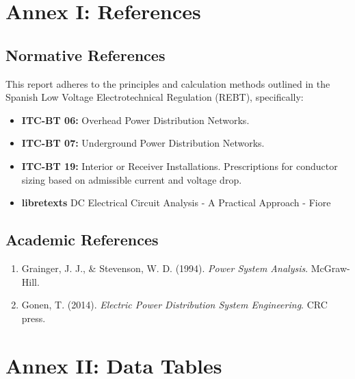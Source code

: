 \documentclass[12pt, a4paper]{article}
\begin{document}
\section{Annex I: References}
\subsection{Normative References}
This report adheres to the principles and calculation methods outlined in the Spanish Low Voltage Electrotechnical Regulation (REBT), specifically:
\begin{itemize}
    \item \textbf{ITC-BT 06:} Overhead Power Distribution Networks.
    \item \textbf{ITC-BT 07:} Underground Power Distribution Networks.
    \item \textbf{ITC-BT 19:} Interior or Receiver Installations. Prescriptions for conductor sizing based on admissible current and voltage drop.
    \item \textbf{libretexts} DC Electrical Circuit Analysis - A Practical Approach - Fiore
\end{itemize}




\subsection{Academic References}
\begin{enumerate}
    \item Grainger, J. J., \& Stevenson, W. D. (1994). \textit{Power System Analysis}. McGraw-Hill.
    \item Gonen, T. (2014). \textit{Electric Power Distribution System Engineering}. CRC press.
\end{enumerate}
    
\newpage

\section{Annex II: Data Tables}
\end{document}
